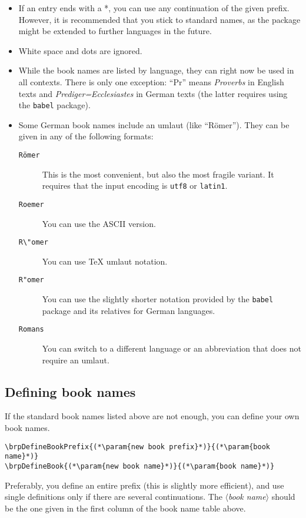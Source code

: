 \documentclass[DIV12,BCOR0mm]{scrartcl}
\newcommand{\ger}[1]{\foreignlanguage{ngerman}{#1}}
\newcommand{\param}[1]{$\langle${\normalfont\itshape #1\/}$\rangle$}
\begin{document}
\begin{itemize}
 \item If an entry ends with a *, you can use any continuation of the given
  prefix. However, it is recommended that you stick to standard names, as the
  package might be extended to further languages in the future.
 \item White space and dots are ignored.
 \item While the book names are listed by language, they can right now be used
  in all contexts. There is only one exception: \enquote{Pr} means
  \emph{Proverbs} in English texts and \emph{\ger{Prediger}=Ecclesiastes}
  in German texts (the latter requires using the \texttt{babel} package).
 \item Some German book names include an umlaut (like \enquote{\ger{Römer}}).
  They can be given in any of the following formats:
  \begin{description}
   \item[\texttt{\color{blue!50!black}Römer}] This is the most convenient, but
    also the most fragile variant. It requires that the input encoding is
    \texttt{utf8} or \texttt{latin1}.
   \item[\texttt{\color{blue!50!black}Roemer}] You can use the ASCII version.
   \item[\texttt{\color{blue!50!black}R\textbackslash"omer}] You can use \TeX{}
    umlaut notation.
   \item[\texttt{\color{blue!50!black}R"omer}] You can use the slightly shorter
    notation provided by the \texttt{babel} package and its relatives for German
    languages.
   \item[\texttt{\color{blue!50!black}Romans}] You can switch to a different
    language or an abbreviation that does not require an umlaut.
\end{description}
\end{itemize}

\subsection{Defining book names}

If the standard book names listed above are not enough, you can define your own
book names.
\begin{lstlisting}
\brpDefineBookPrefix{(*\param{new book prefix}*)}{(*\param{book name}*)}
\brpDefineBook{(*\param{new book name}*)}{(*\param{book name}*)}
\end{lstlisting}
Preferably, you define an entire prefix (this is slightly more efficient), and
use single definitions only if there are several continuations. The \param{book
  name} should be the one given in the first column of the book name table
above.
\end{document}

